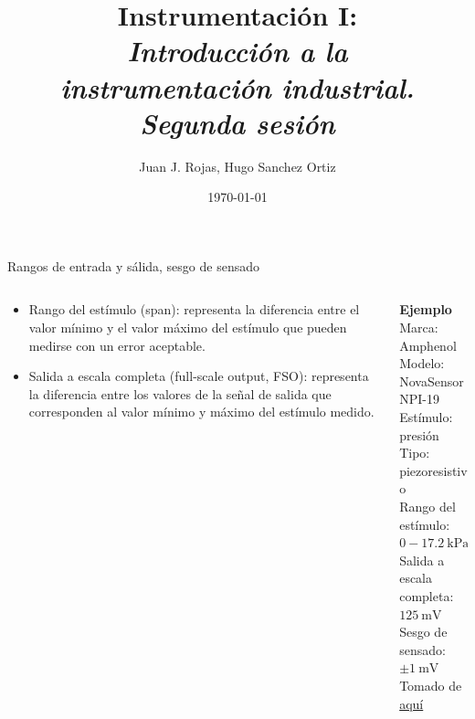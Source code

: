 \documentclass[aspectratio=169]{beamer}
\title{Instrumentación I: \\ \emph{Introducción a la }\\ \emph{instrumentación industrial.} \\ \emph{Segunda sesión}}
\author{
    Juan J. Rojas, Hugo Sanchez Ortiz
}
\institute{Instituto Tecnológico de Costa Rica}
\date{\today}
\begin{document}

\maketitle

\newcommand{\blackandwhite}{white} %

\begin{frame}{Rangos de entrada y sálida, sesgo de sensado}
    \begin{columns}[c, onlytextwidth]
        \begin{column}{0.50\textwidth}
            \begin{itemize}
                \item Rango del estímulo (span): representa la diferencia entre el valor mínimo y el valor máximo del estímulo que pueden medirse con un error aceptable.
                \item Salida a escala completa (full-scale output, FSO): representa la diferencia entre los valores de la señal de salida que corresponden al valor mínimo y máximo del estímulo medido. 
            \end{itemize}
        \end{column}
        \begin{column}{0.45\textwidth}
            \textbf{Ejemplo}\\[4pt]
            Marca: Amphenol\\[4pt]
            Modelo: NovaSensor NPI-19\\[4pt]
            Estímulo: presión\\[4pt]
            Tipo: piezoresistivo\\[4pt]
            Rango del estímulo: $0  - \SI{17.2}{\kilo\pascal}$\\[4pt]
            Salida a escala completa: $\SI{125}{\milli\volt}$\\[4pt]
            Sesgo de sensado: $\pm \SI{1}{\milli\volt}$\\[10pt]
            \tiny{Tomado de \href{https://f.hubspotusercontent40.net/hubfs/9035299/Documents/AAS-920-298B-NovaSensor\%20NPI-19-REVISED-061714-web.pdf}{aquí}}
        \end{column}
    \end{columns}
\end{frame}
\end{document}
